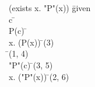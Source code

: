 \documentclass{article}
\begin{document}
\begin{proofbox}
\: \lnot (exists x. "P"(x)) \= \hbox{given} \\
\open
\: c \= \forallintroconst \\
\open
\: P(c) \= \asm \\
\: \exists x. (P(x)) \= \existsintro(3) \\
\: \bot \= \notelim(1, 4) \\
\close
\: \lnot "P"(c) \= \notintro(3, 5) \\
\close
\: \forall x. (\lnot "P"(x)) \= \forallintro(2, 6) \\
\end{proofbox}
\end{document}
